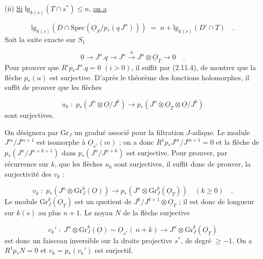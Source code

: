 
(ii)  \underline{Si} $\mathrm{lg}_{k(s)} (T \cap s^*) \leq n$, \underline{on a}

\begin{equation*}
\mathrm{lg}_{k(s)} (D \cap \mathrm{Spec}(\underline{O}_S/p_*(q\,J^n))) \; = \; n + \mathrm{lg}_{k(s)} (D' \cap T) \quad .
\end{equation*}
Soit la suite exacte sur $S_1$

\begin{equation}\tag{2.14.1}
0 \longrightarrow J^n. q \longrightarrow J^n \stackrel{u}{\longrightarrow} J^n \otimes \underline{O}_T \longrightarrow 0 \quad .
\end{equation}
Pour prouver que $R^ip_* J^n.q = 0$  $(i > 0)$, il suffit par (2.11.4), de montrer que la flèche $p_*(u)$ est surjective. D'après le théorème des fonctions holomorphes, il suffit de prouver que les flèches

\begin{equation*}
u_k \; : \; p_*(J^n \otimes \underline{O}/J^k) \longrightarrow p_*(J^n \otimes \underline{O}_T \otimes \underline{O}/J^k)
\end{equation*}
sont surjectives.

On désignera par $\mathrm{Gr}_J$ un gradué associé pour la filtration $J$-adique. Le module $J^m/J^{m+1}$ est isomorphe à $\underline{O}_{s^*}(m)$ ; on a donc $R^1p_*J^m/J^{m+1} = 0$ et la flèche de $p_*(J^n/J^{n+k+1})$ dans $p_*(J^n/J^{n+k})$ est surjective. Pour prouver, par récurrence sur $k$, que les flèches $u_k$ sont surjectives, il suffit donc de prouver, la surjectivité des $v_k$ :

\begin{equation*}
v_k \; : \; p_*(J^n \otimes \mathrm{Gr}_J^k(\underline{O})) \longrightarrow p_*(J^n \otimes \mathrm{Gr}_J^k(\underline{O}_T)) \quad (k \geq 0) \quad .
\end{equation*}
Le module $\mathrm{Gr}_J^k(\underline{O}_T)$ est un quotient de $J^k/J^{k+1} \otimes \underline{O}_T$ ; il est donc de longueur sur $k(s)$ au plus $n+1$. Le noyau $N$ de la flèche surjective

\begin{equation*}
v_k' \; : \; J^n \otimes \mathrm{Gr}_J^k(\underline{O}) \sim \underline{O}_{s^*}(\,n+k) \longrightarrow J^n \otimes \mathrm{Gr}_J^k(\underline{O}_T)
\end{equation*}
est donc un faisceau inversible sur la droite projective $s^*$, de degré $\geq -1$. On a $R^1p_* N = 0$ et $v_k = p_*(v_k')$ est surjectif.

